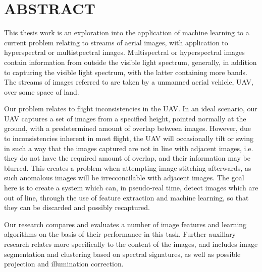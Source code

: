 %
%
%

\chapter*{ABSTRACT}

\pagestyle{plain} %
\setcounter{page}{2}

\indent This thesis work is an exploration into the application of machine learning to a current problem relating to streams of aerial images, with application to hyperspectral or multistpectral images.
Multispectral or hyperspectral images contain information from outside the visible light spectrum, generally, in addition to capturing the visible light spectrum, with the latter containing more bands.
The streams of images referred to are taken by a unmanned aerial vehicle, UAV, over some space of land.

Our problem relates to flight inconsistencies in the UAV.
In an ideal scenario, our UAV captures a set of images from a specified height, pointed normally at the ground, with a predetermined amount of overlap between images.
However, due to inconsistencies inherent in most flight, the UAV will occasionally tilt or swing in such a way that the images captured are not in line with adjacent images, i.e. they do not have the required amount of overlap, and their information may be blurred.
This creates a problem when attempting image stitching afterwards, as such anomalous images will be irrecconcilable with adjacent images.
The goal here is to create a system which can, in pseudo-real time, detect images which are out of line, through the use of feature extraction and machine learning, so that they can be discarded and possibly recaptured.

Our research compares and evaluates a number of image features and learning algorithms on the basis of their performance in this task.
Further auxillary research relates more specifically to the content of the images, and includes image segmentation and clustering based on spectral signatures, as well as possible projection and illumination correction.


 

\pagebreak{}
